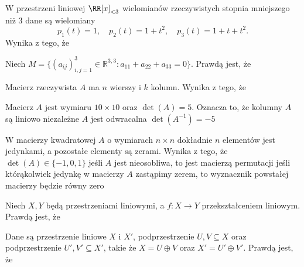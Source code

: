 \begin{problems}
    \prob W przestrzeni liniowej $\RR[x]_{<3}$ wielomianów rzeczywistych stopnia mniejszego niż 3 dane są wielomiany
    $$p_1(t)=1,\quad p_2(t)=1+t^2,\quad p_3(t)=1+t+t^2.$$
    Wynika z tego, że

    \prob Niech $M = \{(a_{ij})_{i,j=1}^{3} \in \mathbb{R}^{3,3} : a_{11}+a_{22}+a_{33}=0 \}$. Prawdą jest, że

    \prob Macierz rzeczywista $A$ ma $n$ wierszy i $k$ kolumn. Wynika z tego, że

    \prob Macierz $A$ jest wymiaru $10 \times 10$ oraz $\det(A) = 5$. Oznacza to, że
    \answers
    {kolumny $A$ są liniowo niezależne}
    {$A$ jest odwracalna}
    {$\det(A^{-1}) = -5$}

    \prob W macierzy kwadratowej $A$ o wymiarach $n \times n$ dokładnie $n$ elementów jest jedynkami, a pozostałe elementy są zerami. Wynika z tego, że
    \answers
    {$\det(A) \in \{-1, 0, 1\}$}
    {jeśli $A$ jest nieosobliwa, to jest macierzą permutacji}
    {jeśli którąkolwiek jedynkę w macierzy $A$ zastąpimy zerem, to wyznacznik powstałej macierzy będzie równy zero}

    \prob Niech $X, Y$ będą przestrzeniami liniowymi, a $f: X \to Y$ przekształceniem liniowym. Prawdą jest, że
    
    \prob Dane są przestrzenie liniowe $X$ i $X'$, podprzestrzenie $U, V \subseteq X$ oraz podprzestrzenie $U', V' \subseteq X'$, takie że $X = U \oplus V$ oraz $X' = U' \oplus V'$. Prawdą jest, że


\end{problems}
